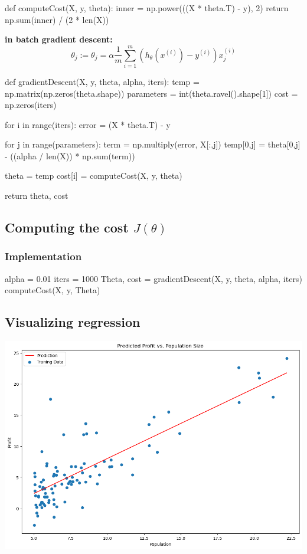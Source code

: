 \documentclass[a4paper, 12pt]{book}
\begin{document}
				\begin{python}
		
	def computeCost(X, y, theta):
		inner = np.power(((X * theta.T) - y), 2)
		return np.sum(inner) / (2 * len(X))
				\end{python}

	\textbf{in batch gradient descent:}
	$$\theta_j:=\theta_j=\alpha\frac{1}{m}\sum_{i=1}^{m}(h_\theta(x^{(i)})-y^{(i)})x^{(i)}_j$$
	
				\begin{python}

	def gradientDescent(X, y, theta, alpha, iters):
		temp = np.matrix(np.zeros(theta.shape))
		parameters = int(theta.ravel().shape[1])
		cost = np.zeros(iters)
		
		for i in range(iters):
			error = (X * theta.T) - y
		
			for j in range(parameters):
				term = np.multiply(error, X[:,j])
				temp[0,j] = theta[0,j] - ((alpha / len(X)) * np.sum(term))
			
			theta = temp
			cost[i] = computeCost(X, y, theta)
		
		return theta, cost
				\end{python}

		\subsection{Computing the cost $J(\theta)$}
			\subsubsection{Implementation}

				\begin{python}
		
	alpha = 0.01
	iters = 1000
	Theta, cost = gradientDescent(X, y, theta, alpha, iters)
	computeCost(X, y, Theta)
				\end{python}
		\subsection{Visualizing regression}
	\includegraphics[width=15cm,keepaspectratio]{regression}
\end{document}
